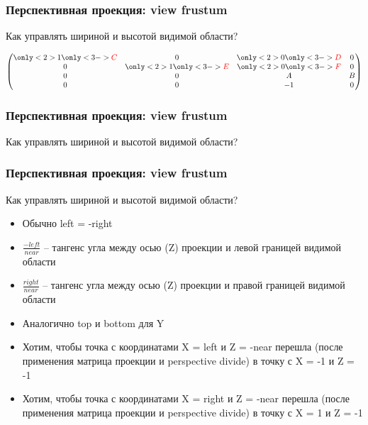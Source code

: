 \documentclass[10pt]{beamer}
\begin{document}
\begin{frame}[fragile]
\frametitle{Перспективная проекция: view frustum}
Как управлять шириной и высотой видимой области?
\pause
\begin{center}
\begin{math}
\begin{pmatrix}
\only<2>{1}\only<3->{\color{red}C} & 0 & \only<2>{0}\only<3->{\color{red}D} & 0 \\
0 & \only<2>{1}\only<3->{\color{red}E} & \only<2>{0}\only<3->{\color{red}F} & 0 \\
0 & 0 & A & B \\
0 & 0 & -1 & 0
\end{pmatrix}
\end{math}
\end{center}
\end{frame}

\begin{frame}[fragile]
\frametitle{Перспективная проекция: view frustum}
Как управлять шириной и высотой видимой области?
\end{frame}

\begin{frame}[fragile]
\frametitle{Перспективная проекция: view frustum}
Как управлять шириной и высотой видимой области?
\begin{itemize}
\item Обычно left = -right
\pause
\item \begin{math}\frac{-left}{near}\end{math} -- тангенс угла между осью (Z) проекции и левой границей видимой области
\item \begin{math}\frac{right}{near}\end{math} -- тангенс угла между осью (Z) проекции и правой границей видимой области
\pause
\item Аналогично top и bottom для Y
\pause
\item Хотим, чтобы точка с координатами X = left и Z = -near перешла (после применения матрица проекции и perspective divide) в точку с X = -1 и Z = -1
\item Хотим, чтобы точка с координатами X = right и Z = -near перешла (после применения матрица проекции и perspective divide) в точку с X = 1 и Z = -1
\end{itemize}
\end{frame}
\end{document}
